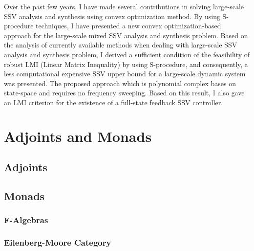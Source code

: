 \documentclass{article}
\begin{document}
Over the past few years, I have made several contributions in solving large-scale SSV analysis and synthesis
using convex optimization method.
By using S-procedure techniques, I have presented a new convex optimization-based
approach for the large-scale mixed SSV analysis and synthesis problem.
Based on the analysis of currently available methods when dealing with large-scale SSV analysis and synthesis problem,
I derived a sufficient condition of the feasibility of robust LMI (Linear Matrix Inequality)
by using S-procedure, and consequently, a less computational expensive SSV upper bound for
a large-scale dynamic system was presented.
The proposed approach {\citep{FYH03}} which is polynomial complex bases on state-space and requires no frequency sweeping.
Based on this result, I also gave an LMI criterion for the existence of a full-state feedback SSV controller.

\section{Adjoints and Monads}

\subsection{Adjoints}

\subsection{Monads}

\subsubsection{F-Algebras}

\subsubsection{Eilenberg-Moore Category}
\end{document}
